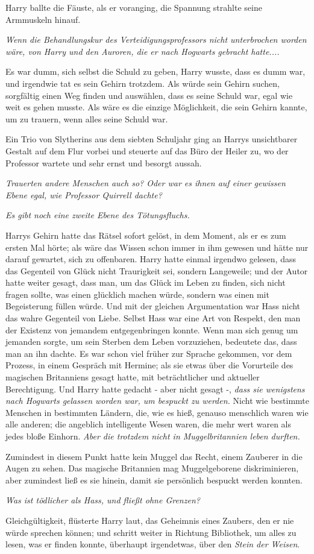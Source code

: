 Harry ballte die Fäuste, als er voranging, die Spannung strahlte seine
Armmuskeln hinauf.

\emph{Wenn die Behandlungskur des Verteidigungsprofessors nicht unterbrochen
worden wäre, von Harry und den Auroren, die er nach Hogwarts gebracht hatte....}

Es war dumm, sich selbst die Schuld zu geben, Harry wusste, dass es dumm war,
und irgendwie tat es sein Gehirn trotzdem. Als würde sein Gehirn suchen,
sorgfältig einen Weg finden und auswählen, dass es seine Schuld war, egal wie
weit es gehen musste. Als wäre es die einzige Möglichkeit, die sein Gehirn
kannte, um zu trauern, wenn alles seine Schuld war.

Ein Trio von Slytherins aus dem siebten Schuljahr ging an Harrys unsichtbarer
Gestalt auf dem Flur vorbei und steuerte auf das Büro der Heiler zu, wo der
Professor wartete und sehr ernst und besorgt aussah.

\emph{Trauerten andere Menschen auch so? Oder war es ihnen auf einer gewissen
Ebene egal, wie Professor Quirrell dachte?}

\emph{Es gibt noch eine zweite Ebene des Tötungsfluchs.}

Harrys Gehirn hatte das Rätsel sofort gelöst, in dem Moment, als er es zum
ersten Mal hörte; als wäre das Wissen schon immer in ihm gewesen und hätte nur
darauf gewartet, sich zu offenbaren. Harry hatte einmal irgendwo gelesen, dass
das Gegenteil von Glück nicht Traurigkeit sei, sondern Langeweile; und der Autor
hatte weiter gesagt, dass man, um das Glück im Leben zu finden, sich nicht
fragen sollte, was einen glücklich machen würde, sondern was einen mit
Begeisterung füllen würde. Und mit der gleichen Argumentation war Hass nicht das
wahre Gegenteil von Liebe. Selbst Hass war eine Art von Respekt, den man der
Existenz von jemandem entgegenbringen konnte. Wenn man sich genug um jemanden
sorgte, um sein Sterben dem Leben vorzuziehen, bedeutete das, dass man an ihn
dachte. Es war schon viel früher zur Sprache gekommen, vor dem Prozess, in einem
Gespräch mit Hermine; als sie etwas über die Vorurteile des magischen
Britanniens gesagt hatte, mit beträchtlicher und aktueller Berechtigung. Und
Harry hatte gedacht - aber nicht gesagt -, \emph{dass sie wenigstens nach
Hogwarts gelassen worden war, um bespuckt zu werden.} Nicht wie bestimmte
Menschen in bestimmten Ländern, die, wie es hieß, genauso menschlich waren wie
alle anderen; die angeblich intelligente Wesen waren, die mehr wert waren als
jedes bloße Einhorn. \emph{ Aber die trotzdem nicht in Muggelbritannien leben
durften.}

Zumindest in diesem Punkt hatte kein Muggel das Recht, einem Zauberer in die
Augen zu sehen. Das magische Britannien mag Muggelgeborene diskriminieren, aber
zumindest ließ es sie hinein, damit sie persönlich bespuckt werden konnten.

\emph{Was ist tödlicher als Hass, und fließt ohne Grenzen?}

\glqq{}Gleichgültigkeit\grqq{}, flüsterte Harry laut, das Geheimnis eines
Zaubers, den er nie würde sprechen können; und schritt weiter in Richtung
Bibliothek, um alles zu lesen, was er finden konnte, überhaupt irgendetwas, über
den \emph{Stein der Weisen}.

